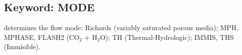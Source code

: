 \hyperlink{target_key}{\return}

\newpage
\protect\hypertarget{target_mode}{}

\subsection{Keyword: MODE}

\hfill\hyperlink{target_key}{\return}

 determines the flow mode: Richards (variably saturated porous media); MPH, \linebreak MPHASE, FLASH2 (CO$_2$ + H$_2$O); TH (Thermal-Hydrologic); IMMIS, THS (Immisible).

